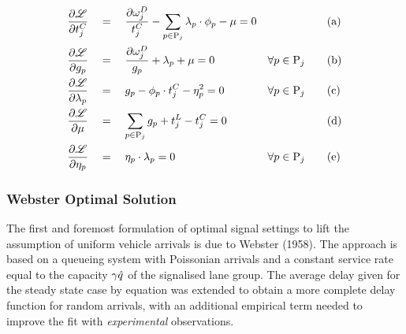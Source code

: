 %
%
%


\begin{eqnarray}
\begin{aligned}
\frac{\partial \mathscr{L}}{\partial t_{j}^C} & \quad = \quad 
\frac{\partial\omega_{j}^{D}}{t_{j}^C} - 
\sum_{p \in \mathrm{P}_j} \lambda_p \cdot \phi_p - \mu = 0 & & \mathrm{(a)}\\
\frac{\partial \mathscr{L}}{\partial g_{p}} & \quad = \quad
\frac{\partial\omega_{j}^{D}}{g_{p}} + 
\lambda_p + \mu = 0 & \forall p \in \mathrm{P}_j \qquad & \mathrm{(b)}\\
\frac{\partial \mathscr{L}}{\partial \lambda_p} & \quad = \quad
g_{p} - \phi_p \cdot t_{j}^C - \eta_p^2 = 0 & \forall p \in \mathrm{P}_j \qquad & \mathrm{(c)}\\
\frac{\partial \mathscr{L}}{\partial \mu} & \quad = \quad
\sum_{p \in \mathrm{P}_j} g_{p} + t_{j}^L - t_{j}^C = 0 & & \mathrm{(d)}\\
\frac{\partial \mathscr{L}}{\partial \eta_p} & \quad = \quad
\eta_p \cdot \lambda_p = 0 \qquad \qquad & \forall p \in \mathrm{P}_j \qquad & \mathrm{(e)}\\
\end{aligned}
\end{eqnarray}

\subsubsection*{Webster Optimal Solution}
The first and foremost formulation of optimal signal settings to lift the assumption of uniform vehicle arrivals is due to Webster (1958). The approach is based on a queueing system with Poissonian arrivals and a constant service rate equal to the capacity $\gamma_{} \hat{q}$ of the signalised lane group.
The average delay given for the steady state case by equation  was extended to obtain a more complete delay function for random arrivals, with an additional empirical term needed to
improve the fit with \emph{experimental} observations.

